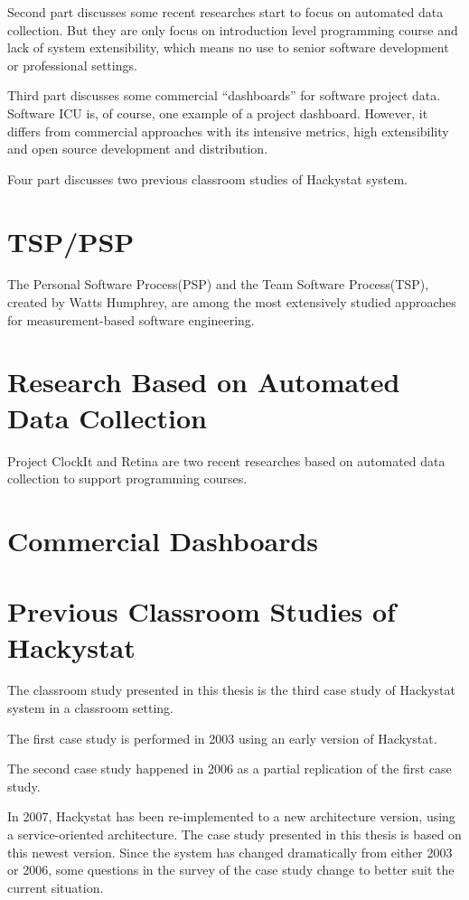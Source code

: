 Second part discusses some recent researches start to focus on automated data collection. But they are only focus on introduction level programming course and lack of system extensibility, which means no use to senior software development or professional settings. 

Third part discusses some commercial ``dashboards'' for software project data. Software ICU is, of course, one example of a project dashboard. However, it differs from commercial approaches with its intensive metrics, high extensibility and open source development and distribution. 

Four part discusses two previous classroom studies of Hackystat system. 

\section {TSP/PSP}
The Personal Software Process(PSP)\cite{book:psp} and the Team Software Process(TSP)\cite{book:tsp}, created by Watts Humphrey, are among the most extensively studied approaches for measurement-based software engineering.

\section {Research Based on Automated Data Collection}
Project ClockIt and Retina are two recent researches based on automated data collection to support programming courses.

\section {Commercial Dashboards}

\section {Previous Classroom Studies of Hackystat}
The classroom study presented in this thesis is the third case study of Hackystat system in a classroom setting. 

The first case study is performed in 2003 using an early version of Hackystat.

The second case study happened in 2006 as a partial replication of the first case study. 

In 2007, Hackystat has been re-implemented to a new architecture version, using a service-oriented architecture. The case study presented in this thesis is based on this newest version. Since the system has changed dramatically from either 2003 or 2006, some questions in the survey of the case study change to better suit the current situation.

